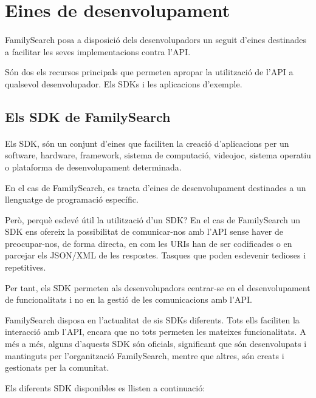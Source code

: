 \section{Eines de desenvolupament}

    \paragraph{}
    FamilySearch posa a disposició dels desenvolupadors un seguit d'eines destinades a facilitar les seves implementacions contra l'API.

    Són dos els recursos principals que permeten apropar la utilització de l'API a qualsevol desenvolupador. Els SDKs i les aplicacions d'exemple.

    \subsection{Els SDK de FamilySearch}

        \paragraph{}
        Els \gls{SDK}, són un conjunt d'eines que faciliten la creació d'aplicacions per un software, hardware, framework, sistema de computació, videojoc, sistema operatiu o plataforma de desenvolupament determinada.

        En el cas de FamilySearch, es tracta d'eines de desenvolupament destinades a un llenguatge de programació específic.

        Però, perquè esdevé útil la utilització d'un SDK? En el cas de FamilySearch un SDK ens ofereix la possibilitat de comunicar-nos amb l'API sense haver de preocupar-nos, de forma directa, en com les URIs han de ser codificades o en parcejar els JSON/XML de les respostes. Tasques que poden esdevenir tedioses i repetitives.

        Per tant, els SDK permeten als desenvolupadors centrar-se en el desenvolupament de funcionalitats i no en la gestió de les comunicacions amb l'API.

        FamilySearch disposa en l'actualitat de sis SDKs diferents. Tots ells faciliten la interacció amb l'API, encara que no tots permeten les mateixes funcionalitats. A més a més, alguns d'aquests SDK són oficials, significant que són desenvolupats i mantinguts per l'organització FamilySearch, mentre que altres, són creats i gestionats per la comunitat.

        Els diferents SDK disponibles es llisten a continuació:

